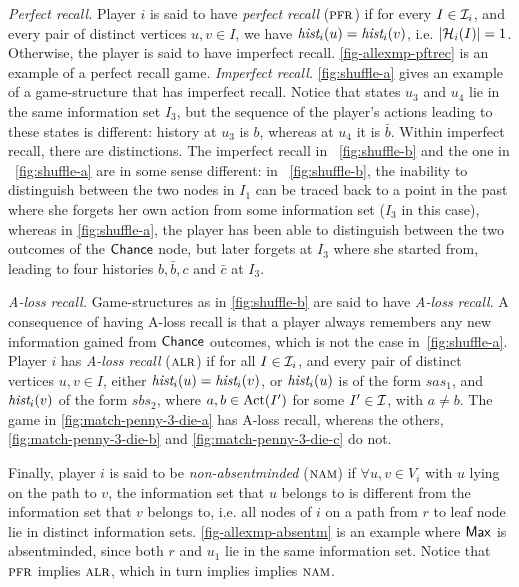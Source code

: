\emph{Perfect recall.} Player $i$ is said to have \emph{perfect
  recall} ($\textsc{pfr}$) if for every $I \in \mathcal{I}_i$, and every pair of
distinct vertices $u, v \in I$, we have $\textit{hist}_i(u) = \textit{hist}_i(v)$,
i.e. $|\mathcal{H}_i(I)| = 1$.  Otherwise, the player is said to have imperfect
recall.  \cref{fig-allexmp-pftrec} is an example of a perfect recall
game.
\emph{Imperfect recall.} \cref{fig:shuffle-a} gives an example of
a game-structure that has imperfect recall. Notice that states $u_3$
and $u_4$ lie in the same information set $I_3$, but the sequence of
the player's actions leading to these states is different: history at
$u_3$ is $b$, whereas at $u_4$ it is $\bar{b}$. 
Within imperfect recall,
there are distinctions. The imperfect recall in
~\cref{fig:shuffle-b} and the one in ~\cref{fig:shuffle-a}
are in some sense different: in ~\cref{fig:shuffle-b}, the
inability to distinguish between the two nodes in $I_1$ can be traced back to
a point in the past where she forgets her own action from some
information set ($I_3$ in this case), whereas in \cref{fig:shuffle-a}, the player has been able to
distinguish between the two outcomes of the $\mathsf{Chance}$ node, but later
forgets at $I_3$ where she started from, leading to four histories $b,\bar{b},c$ and $\bar{c}$ at $I_3$.


\emph{A-loss recall.} Game-structures as in \cref{fig:shuffle-b} are said to have \emph{A-loss
  recall}. A consequence of having A-loss recall is that a player always remembers any new information
gained from $\mathsf{Chance}$ outcomes, which is not the case
in~\cref{fig:shuffle-a}. Player $i$ has \emph{A-loss recall}
($\textsc{alr}$) if for all $I \in \mathcal{I}_i$, and every pair of distinct vertices
$u, v \in I$, either $\textit{hist}_i(u) = \textit{hist}_i(v)$, or $\textit{hist}_i(u)$ is of the
form $s a s_1$, and $\textit{hist}_i(v)$ of the form $s b s_2$, where
$a, b \in \operatorname{Act}(I')$ for some $I' \in \mathcal{I}$, with $a \neq b$. The game in \cref{fig:match-penny-3-die-a} has A-loss recall, whereas the others, \cref{fig:match-penny-3-die-b} and \cref{fig:match-penny-3-die-c} do not.  

Finally, player $i$ is said to be
\emph{non-absentminded} ($\textsc{nam}$) if $\forall u, v \in V_i$ with $u$
lying on the path to $v$, the information set that $u$ belongs to is
different from the information set that $v$ belongs
to, i.e. all nodes of $i$ on a path from $r$ to leaf node lie in distinct
information sets. \cref{fig-allexmp-absentm} is an example where
$\mathsf{Max}$ is absentminded, since both $r$ and $u_1$ lie in the same
information set. Notice that $\textsc{pfr}$ implies $\textsc{alr}$, which in turn implies implies $\textsc{nam}$. 

